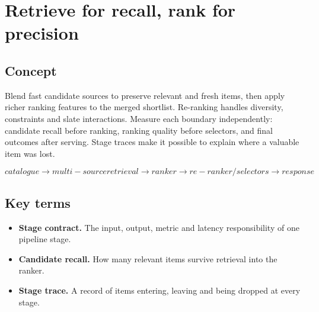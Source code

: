 \section{Retrieve for recall, rank for precision}

\begin{abstract}
Use different models for different scales instead of forcing one stage to do every job.
\end{abstract}

\subsection{Concept}
Blend fast candidate sources to preserve relevant and fresh items, then apply richer ranking features to the merged shortlist. Re-ranking handles diversity, constraints and slate interactions. Measure each boundary independently: candidate recall before ranking, ranking quality before selectors, and final outcomes after serving. Stage traces make it possible to explain where a valuable item was lost.

\begin{equation*}
catalogue \rightarrow multi-source retrieval \rightarrow ranker \rightarrow re-ranker/selectors \rightarrow response
\end{equation*}

\subsection{Key terms}
\begin{itemize}
\item \textbf{Stage contract.} The input, output, metric and latency responsibility of one pipeline stage.
\item \textbf{Candidate recall.} How many relevant items survive retrieval into the ranker.
\item \textbf{Stage trace.} A record of items entering, leaving and being dropped at every stage.
\end{itemize}
